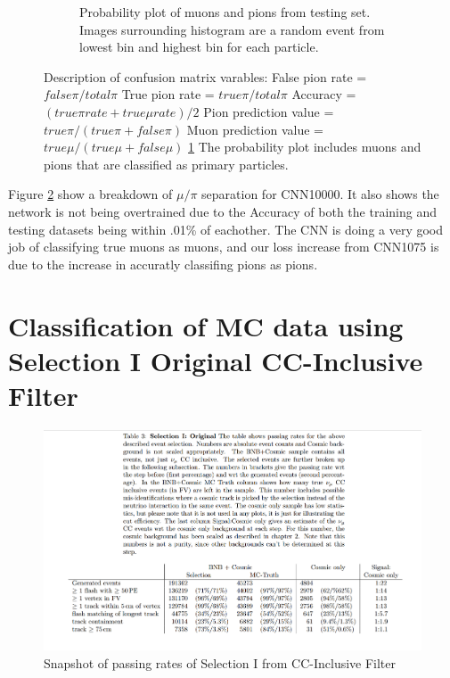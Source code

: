 \begin{figure}[htp!]
\begin{subfigure}[b]{\textwidth}
	\caption{Probability plot of muons and pions from testing set. Images surrounding histogram are a random event from lowest bin and highest bin for each particle.}
	\label{fig:prob_plot}
	\end{subfigure}
\caption{Description of confusion matrix varables: False pion rate = $false \pi/ total \pi$ True pion rate = $true \pi/total \pi$ Accuracy = $(true \pi rate + true \mu rate)/2$ Pion prediction value = $true \pi/(true \pi + false \pi)$ Muon prediction value = $true \mu/(true \mu + false \mu)$ \ref{fig:prob_plot} The probability plot includes muons and pions that are classified as primary particles.}
\label{fig:CNN_train}
\end{figure}

Figure \ref{fig:CNN_train} show a breakdown of $\mu/\pi$ separation for CNN10000. It also shows the network is not being overtrained due to the Accuracy of both the training and testing datasets being within .01\% of eachother. The CNN is doing a very good job of classifying true muons as muons, and our loss increase from CNN1075 is due to the increase in accuratly classifing pions as pions. 



\section{Classification of MC data using Selection I Original CC-Inclusive Filter}\label{sel1orig}

\begin{figure}[htp!]
\centering
\includegraphics[width=.9\textwidth]{figs/sel1_cuts.png}
\caption{Snapshot of passing rates of Selection I from CC-Inclusive Filter} 
\label{fig:cuttable}
\end{figure}

